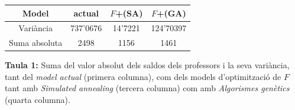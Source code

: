 \documentclass[10pt,twocolumn]{article}
\begin{document}
\begin{tcolorbox}[colback=white,coltitle=black,colframe=white, colback=white]
{\centering
	\small
	\begin{tabular}{|c|c|c|c|}
	\hline
     \textbf{Model}&\textbf{actual}&\textbf{$F$+(SA)}&\textbf{$F$+(GA)}\\
     \hline
     Variància&737'0676&14'7221&124'70397\\
     \hline
     Suma absoluta&2498&1156&1461\\
     \hline
	\end{tabular}
}
\end{tcolorbox}
\noindent \textbf{Taula 1:} \small{Suma del valor absolut dels saldos dels professors  i la seva variància, tant del \textit{model actual} (primera columna), com dels models d'optimització de $F$ tant amb \textit{Simulated annealing} (tercera columna) com amb \textit{Algorismes genètics} (quarta columna).}
\vspace{3mm}
\end{document}
